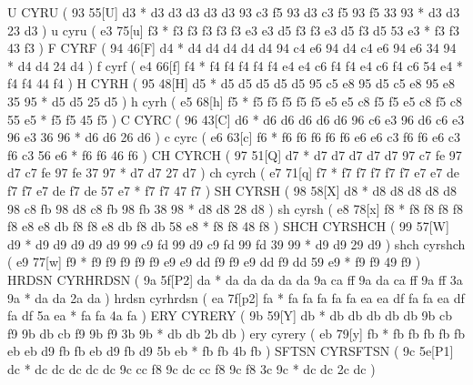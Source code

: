 \makeCOD U            CYRU              ( 93 55[U]   d3 *   d3 d3 d3 d3    d3 93 c3 f5 93    d3 c3 f5 93    f5 33 93    *   d3 d3   23 d3  )
\makecod u            cyru              ( e3 75[u]   f3 *   f3 f3 f3 f3    f3 e3 e3 d5 f3    f3 e3 d5 f3    d5 53 e3    *   f3 f3   43 f3  )
\makeCOD F            CYRF              ( 94 46[F]   d4 *   d4 d4 d4 d4    d4 94 c4 e6 94    d4 c4 e6 94    e6 34 94    *   d4 d4   24 d4  )
\makecod f            cyrf              ( e4 66[f]   f4 *   f4 f4 f4 f4    f4 e4 e4 c6 f4    f4 e4 c6 f4    c6 54 e4    *   f4 f4   44 f4  )
\makeCOD H            CYRH              ( 95 48[H]   d5 *   d5 d5 d5 d5    d5 95 c5 e8 95    d5 c5 e8 95    e8 35 95    *   d5 d5   25 d5  )
\makecod h            cyrh              ( e5 68[h]   f5 *   f5 f5 f5 f5    f5 e5 e5 c8 f5    f5 e5 c8 f5    c8 55 e5    *   f5 f5   45 f5  )
\makeCOD C            CYRC              ( 96 43[C]   d6 *   d6 d6 d6 d6    d6 96 c6 e3 96    d6 c6 e3 96    e3 36 96    *   d6 d6   26 d6  )
\makecod c            cyrc              ( e6 63[c]   f6 *   f6 f6 f6 f6    f6 e6 e6 c3 f6    f6 e6 c3 f6    c3 56 e6    *   f6 f6   46 f6  )
\makeCOD CH           CYRCH             ( 97 51[Q]   d7 *   d7 d7 d7 d7    d7 97 c7 fe 97    d7 c7 fe 97    fe 37 97    *   d7 d7   27 d7  )
\makecod ch           cyrch             ( e7 71[q]   f7 *   f7 f7 f7 f7    f7 e7 e7 de f7    f7 e7 de f7    de 57 e7    *   f7 f7   47 f7  )
\makeCOD SH           CYRSH             ( 98 58[X]   d8 *   d8 d8 d8 d8    d8 98 c8 fb 98    d8 c8 fb 98    fb 38 98    *   d8 d8   28 d8  )
\makecod sh           cyrsh             ( e8 78[x]   f8 *   f8 f8 f8 f8    f8 e8 e8 db f8    f8 e8 db f8    db 58 e8    *   f8 f8   48 f8  )
\makeCOD SHCH         CYRSHCH           ( 99 57[W]   d9 *   d9 d9 d9 d9    d9 99 c9 fd 99    d9 c9 fd 99    fd 39 99    *   d9 d9   29 d9  )
\makecod shch         cyrshch           ( e9 77[w]   f9 *   f9 f9 f9 f9    f9 e9 e9 dd f9    f9 e9 dd f9    dd 59 e9    *   f9 f9   49 f9  )
\makeCOD HRDSN        CYRHRDSN          ( 9a 5f[P2]  da *   da da da da    da 9a ca ff 9a    da ca ff 9a    ff 3a 9a    *   da da   2a da  )
\makecod hrdsn        cyrhrdsn          ( ea 7f[p2]  fa *   fa fa fa fa    fa ea ea df fa    fa ea df fa    df 5a ea    *   fa fa   4a fa  )
\makeCOD ERY          CYRERY            ( 9b 59[Y]   db *   db db db db    db 9b cb f9 9b    db cb f9 9b    f9 3b 9b    *   db db   2b db  )
\makecod ery          cyrery            ( eb 79[y]   fb *   fb fb fb fb    fb eb eb d9 fb    fb eb d9 fb    d9 5b eb    *   fb fb   4b fb  )
\makeCOD SFTSN        CYRSFTSN          ( 9c 5e[P1]  dc *   dc dc dc dc    dc 9c cc f8 9c    dc cc f8 9c    f8 3c 9c    *   dc dc   2c dc  )
